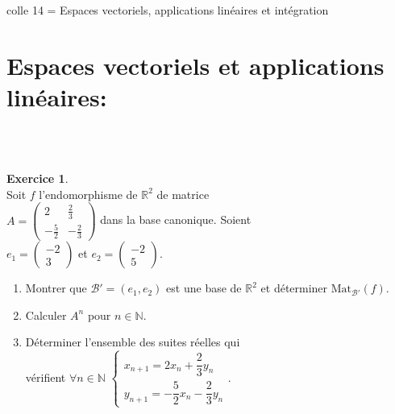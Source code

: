 \documentclass[a4paper,10pt]{article}
\theoremstyle{definition}
\theoremstyle{definition}
\newtheorem{exo}{Exercice}
\newcommand{\R}{\mathbb{R}}
\newcommand{\N}{\mathbb{N}}
\begin{document}
	
	
	\begin{center}
		\Large \sc colle 14 = Espaces vectoriels, applications linéaires et intégration
	\end{center}





\section*{Espaces vectoriels et applications linéaires:}\hfill\\\hfill\\
\begin{minipage}{1\linewidth}
	\begin{minipage}[t]{0.48\linewidth}
		\raggedright
		
		
		
	\begin{exo}\quad\\
		Soit $f$ l'endomorphisme de $\R^2$ de matrice\\[0.25cm] $A=\begin{pmatrix} 2&\frac 23\\[0.25cm]
		-\frac 52&-\frac 23 \end{pmatrix}$ dans la base canonique. Soient\\[0.25cm] 
		$e_1 = \begin{pmatrix} -2 \\ 3\end{pmatrix}$
		et $e_2 = \begin{pmatrix} -2 \\ 5 \end{pmatrix}$.
		\begin{enumerate}
			\item Montrer que $\mathcal{B}'= (e_1, e_2)$ est une base de $\R^2$ et déterminer 
			$\text{Mat}_{\mathcal{B}'}(f)$.
			\item Calculer $A^n$ pour $n \in \N$.
			\item Déterminer l'ensemble des suites réelles qui \\[0.25cm]vérifient $\forall n \in \N$
			$\begin{cases} x_{n + 1} = 2x_n + \dfrac 23 y_n \\ y_{n + 1} = -\dfrac 52 x_n -
			\dfrac 23 y_n \end{cases}$.\\[0.25cm]
		\end{enumerate}
		

\end{exo}
\end{minipage}
\end{minipage}
\end{document}
